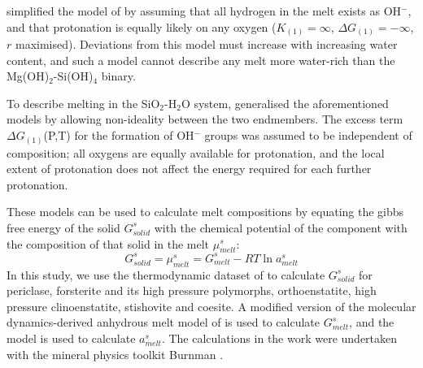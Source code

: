 \documentclass[review]{elsarticle}
\begin{document}
\cite{THH2012} simplified the model of \cite{SS1985} by assuming that all hydrogen in the melt exists as OH$^-$, and that protonation is equally likely on any oxygen ($K_{(1)}=\infty$, $\Delta G_{(1)}=-\infty$, $r$ maximised). Deviations from this model must increase with increasing water content, and such a model cannot describe any melt more water-rich than the Mg(OH)$_2$-Si(OH)$_4$ binary. 

To describe melting in the SiO$_2$-H$_2$O system, \cite{HM2012} generalised the aforementioned models by allowing non-ideality between the two endmembers. The excess term $\Delta G_{(1)}$(P,T) for the formation of OH$^-$ groups was assumed to be independent of composition; all oxygens are equally available for protonation, and the local extent of protonation does not affect the energy required for each further protonation.


These models can be used to calculate melt compositions by equating the gibbs free energy of the solid $G^s_{solid}$ with the chemical potential of the component with the composition of that solid in the melt $\mu^s_{melt}$:
\begin{equation}
G^s_{solid} = \mu^s_{melt} = G^s_{melt} - RT \ln a^s_{melt}
\label{eqn:equilibrium}
\end{equation}
In this study, we use the thermodynamic dataset of \cite{SLB2011} to calculate $G^s_{solid}$ for periclase, forsterite and its high pressure polymorphs, orthoenstatite, high pressure clinoenstatite, stishovite and coesite. A modified version of the molecular dynamics-derived anhydrous melt model of \cite{DKS2013} is used to calculate $G^s_{melt}$, and the \cite{SS1985} model is used to calculate $a^s_{melt}$. The calculations in the work were undertaken with the mineral physics toolkit Burnman \citep[available from \url{https://geodynamics.org/cig/software/burnman/}][]{CHRU2014}.
\end{document}
